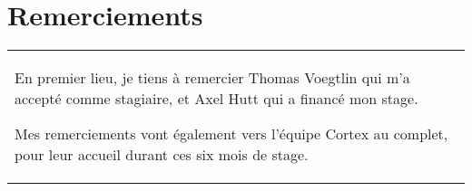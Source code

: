 \chapter*{Remerciements}
\thispagestyle{empty}
\begin{flushleft}
  \begin{tabularx}{14cm}{X}
     En premier lieu, je tiens à remercier Thomas Voegtlin qui m'a accepté
     comme stagiaire, et Axel Hutt qui a financé mon stage.

     Mes remerciements vont également vers l'équipe Cortex au complet, pour leur
     accueil durant ces six mois de stage.
  \end{tabularx}
\end{flushleft}
